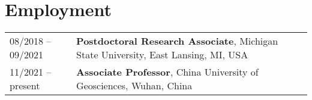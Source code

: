 \section*{Employment}
\begin{tabular}{p{} p{}}
08/2018 -- 09/2021 & \textbf{Postdoctoral Research Associate},
		              Michigan State University, East Lansing, MI, USA \\
11/2021 -- present & \textbf{Associate Professor},
					  China University of Geosciences, Wuhan, China \\
\end{tabular}
